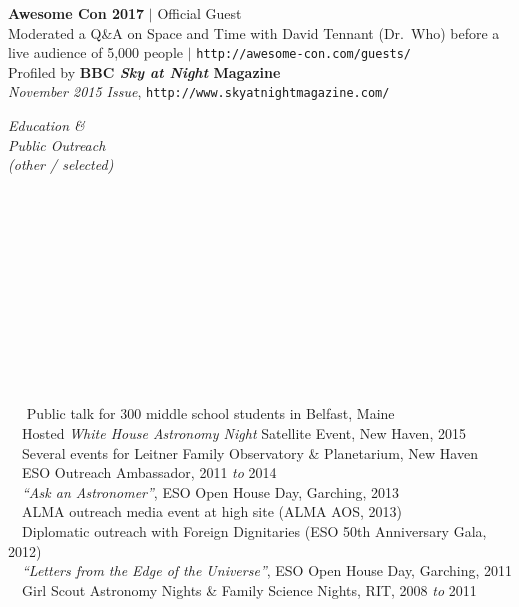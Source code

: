 \documentclass[11pt]{article}
\begin{document}
{\textbf{Awesome Con 2017} $|$ Official Guest \\
Moderated a Q\&A on Space and Time with David Tennant (Dr.~Who) before a live audience of 5,000 people $|$ \texttt{http://awesome-con.com/guests/}  \\



Profiled by \textbf{BBC \textit{Sky at Night} Magazine} \\ \textit{November 2015 Issue},
{\footnotesize \texttt{http://www.skyatnightmagazine.com/}}\\ }


\vspace{4mm}




\hspace{2.5mm} \parbox{1.5in}{\textit{Education \& \\ Public Outreach \\ (other / selected) \\\\\\\\\\\\\\\\\\\\\\\\}} \parbox{5.15in}{
\textbullet~~ Public talk for 300 middle school students in Belfast, Maine\\
\textbullet~~Hosted \textit{White House Astronomy Night} Satellite Event, New Haven, 2015
\\
\textbullet~~Several events for Leitner Family Observatory \& Planetarium, New Haven
\\
\textbullet~~ESO Outreach Ambassador, 2011 \textit{to} 2014
\\\textbullet~~\textit{``Ask an Astronomer''}, ESO Open House Day, Garching, 2013
\\\textbullet~~ALMA outreach media event at high site (ALMA AOS, 2013)
\\\textbullet~~Diplomatic outreach with Foreign Dignitaries (ESO 50th Anniversary Gala, 2012)
\\ \textbullet~~\textit{``Letters from the Edge of the Universe''}, ESO Open House Day, Garching, 2011
\\ \textbullet~~Girl Scout Astronomy Nights \& Family Science Nights, RIT, 2008 \textit{to} 2011
}
\end{document}
